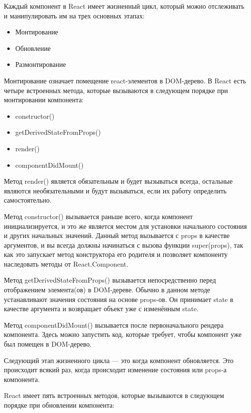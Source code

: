 \documentclass[14pt, a4paper]{diplom}
\begin{document}
Каждый компонент в React имеет жизненный цикл, который можно отслеживать и манипулировать им на трех основных этапах:

\begin{itemize}
\item Монтирование
\item Обновление
\item Размонтирование
\end{itemize}

Монтирование означает помещение react-элементов в DOM-дерево. В React есть четыре встроенных метода, которые вызываются в следующем порядке при монтировании компонента:

\begin{itemize}
  \item constructor()
  \item getDerivedStateFromProps()
  \item render()
  \item componentDidMount()
\end{itemize}

Метод render() является обязательным и будет вызываться всегда, остальные являются необязательными и будут вызываться, если их работу определить самостоятельно.

Метод constructor() вызывается раньше всего, когда компонент инициализируется, и это же является местом для установки начального состояния и других начальных значений. Данный метод вызывается с props в качестве аргументов, и вы всегда должны начинаться с вызова функции super(props), так как это запускает метод конструктора его родителя и позволяет компоненту наследовать методы от React.Component.

Метод getDerivedStateFromProps() вызывается непосредственно перед отображением элемента(ов) в DOM-дереве. Обычно в данном методе устанавливают значения состояния на основе props-ов. Он принимает state в качестве аргумента и возвращает объект уже с изменённым state.

Метод componentDidMount() вызывается после первоначального рендера компонента.
Здесь можно запустить код, которые требует, чтобы компонент уже был помещен в DOM-дерево.

Следующий этап жизненного цикла — это когда компонент обновляется.
Это происходит всякий раз, когда происходит изменение состояния или props-а компонента.

React имеет пять встроенных методов, которые вызываются в следующем порядке при обновлении компонента:
\end{document}
